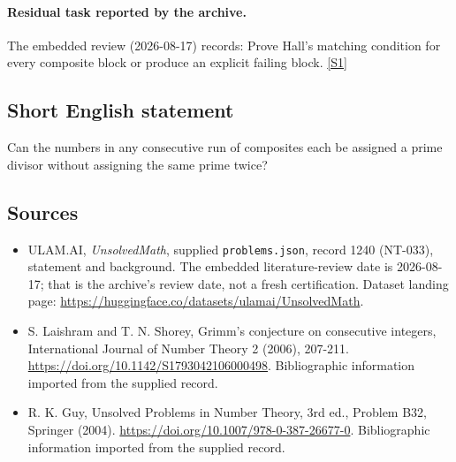 \documentclass[11pt,a4paper]{article}
\newcommand{\sref}[2]{\hyperlink{source:#1:#2}{[S#2]}}
\begin{document}
\paragraph{Residual task reported by the archive.}

The embedded review (2026-08-17) records: Prove Hall's matching condition for every composite block or produce an explicit failing block. \sref{1240}{1}

\subsection{Short English statement}

Can the numbers in any consecutive run of composites each be assigned a prime divisor without assigning the same prime twice?

\subsection{Sources}

{\small

\begin{itemize}

\item[\hypertarget{source:1240:1}{S1}] ULAM.AI, \emph{UnsolvedMath}, supplied \texttt{problems.json}, record 1240 (NT-033), statement and background. The embedded literature-review date is 2026-08-17; that is the archive’s review date, not a fresh certification. Dataset landing page: \url{https://huggingface.co/datasets/ulamai/UnsolvedMath}.

\item[\hypertarget{source:1240:2}{S2}] S. Laishram and T. N. Shorey, Grimm's conjecture on consecutive integers, International Journal of Number Theory 2 (2006), 207-211. \url{https://doi.org/10.1142/S1793042106000498}. Bibliographic information imported from the supplied record.

\item[\hypertarget{source:1240:3}{S3}] R. K. Guy, Unsolved Problems in Number Theory, 3rd ed., Problem B32, Springer (2004). \url{https://doi.org/10.1007/978-0-387-26677-0}. Bibliographic information imported from the supplied record.

\end{itemize}

}

\label{end:1240}
\end{document}
